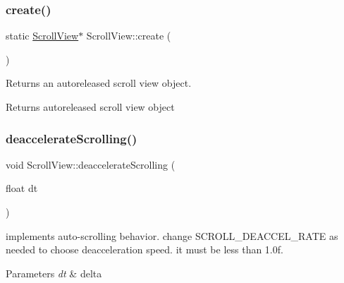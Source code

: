 \subsubsection{\texorpdfstring{create()}{create()}\hspace{0.1cm}{\footnotesize\ttfamily [4/4]}}
{\footnotesize\ttfamily static \hyperlink{classScrollView}{Scroll\+View}$\ast$ Scroll\+View\+::create (\begin{DoxyParamCaption}{ }\end{DoxyParamCaption})\hspace{0.3cm}{\ttfamily [static]}}

Returns an autoreleased scroll view object.

\begin{DoxyReturn}{Returns}
autoreleased scroll view object 
\end{DoxyReturn}
\mbox{\label{classScrollView_ad3519eeb9b3afad87767e722b54427f0}} 
\subsubsection{\texorpdfstring{deaccelerate\+Scrolling()}{deaccelerateScrolling()}\hspace{0.1cm}{\footnotesize\ttfamily [1/2]}}
{\footnotesize\ttfamily void Scroll\+View\+::deaccelerate\+Scrolling (\begin{DoxyParamCaption}\item[{float}]{dt }\end{DoxyParamCaption})\hspace{0.3cm}{\ttfamily [protected]}}

implements auto-\/scrolling behavior. change S\+C\+R\+O\+L\+L\+\_\+\+D\+E\+A\+C\+C\+E\+L\+\_\+\+R\+A\+TE as needed to choose deacceleration speed. it must be less than 1.\+0f.


\begin{DoxyParams}{Parameters}
{\em dt} & delta \\
\hline
\end{DoxyParams}
\mbox{\label{classScrollView_ad3519eeb9b3afad87767e722b54427f0}} 
